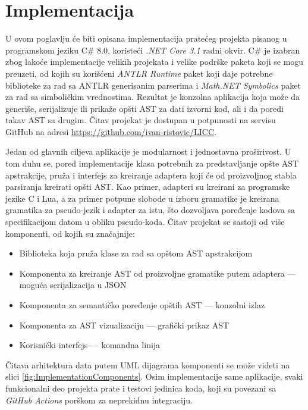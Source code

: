 \chapter{Implementacija}
\label{chp:Implementation}

U ovom poglavlju će biti opisana implementacija pratećeg projekta pisanog u programskom jeziku C\# 8.0, koristeći \emph{.NET Core 3.1} radni okvir. C\# je izabran zbog lakoće implementacije velikih projekata i velike podrške paketa koji se mogu preuzeti, od kojih su korišćeni \emph{ANTLR Runtime} paket koji daje potrebne biblioteke za rad sa ANTLR generisanim parserima i \emph{Math.NET Symbolics} paket za rad sa simboličkim vrednostima. Rezultat je konzolna aplikacija koja može da generiše, serijalizuje ili prikaže opšti AST za dati izvorni kod, ali i da poredi takav AST sa drugim. Čitav projekat je dostupan u potpunosti na servisu GitHub na adresi \url{https://github.com/ivan-ristovic/LICC}.

Jedan od glavnih ciljeva aplikacije je modularnost i jednostavna proširivost. U tom duhu se, pored implementacije klasa potrebnih za predstavljanje opšte AST apstrakcije, pruža i interfejs za kreiranje adaptera koji će od proizvoljnog stabla parsiranja kreirati opšti AST. Kao primer, adapteri su kreirani za programske jezike C i Lua, a za primer potpune slobode u izboru gramatike je kreirana gramatika za pseudo-jezik i adapter za istu, što dozvoljava poređenje kodova sa specifikacijom datom u obliku pseudo-koda. Čitav projekat se sastoji od više komponenti, od kojih su značajnije:
\begin{itemize}
    \item Biblioteka koja pruža klase za rad sa opštom AST apstrakcijom
    \item Komponenta za kreiranje AST od proizvoljne gramatike putem adaptera --- moguća serijalizacija u JSON
    \item Komponenta za semantičko poređenje opštih AST --- konzolni izlaz
    \item Komponenta za AST vizualizaciju --- grafički prikaz AST
    \item Korisnički interfejs --- komandna linija
\end{itemize}

Čitava arhitektura data putem UML dijagrama komponenti se može videti na slici \ref{fig:ImplementationComponents}. Osim implementacije same aplikacije, svaki funkcionalni deo projekta prate i testovi jedinica koda, koji su povezani sa \emph{GitHub Actions} porškom za neprekidnu integraciju.

